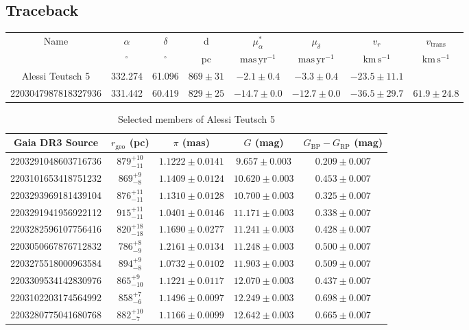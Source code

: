     \subsection{Traceback}
    

\begin{table}
\begin{tabular}{cccccccc}
Name & $\alpha$ & $\delta$ & d & $\mu_{\alpha}^*$ & $\mu_{\delta}$ & $v_r$ & $v_\text{trans}$ \\
 & $\mathrm{{}^{\circ}}$ & $\mathrm{{}^{\circ}}$ & $\mathrm{pc}$ & $\mathrm{mas\,yr^{-1}}$ & $\mathrm{mas\,yr^{-1}}$ & $\mathrm{km\,s^{-1}}$ & $\mathrm{km\,s^{-1}}$ \\
Alessi Teutsch 5 & 332.274 & 61.096 & $869\pm31$ & $-2.1\pm0.4$ & $-3.3\pm0.4$ & $-23.5\pm11.1$ &  \\
2203047987818327936 & 331.442 & 60.419 & $829\pm25$ & $-14.7\pm0.0$ & $-12.7\pm0.0$ & $-36.5\pm29.7$ & $61.9\pm24.8$ \\
\end{tabular}
\end{table}


\begin{table*}[h]
\caption{Selected members of Alessi Teutsch 5}
\label{tab:Alessi_Teutsch_5_members}
\begin{tabular}{ccccc}
\hline
Gaia DR3 Source & $r_{\text{geo}}$ (pc) & $\pi$ (mas) & $G$ (mag) & $G_{\text{BP}}-G_{\text{RP}}$ (mag) \\
\hline
2203291048603716736 & $879^{+10}_{-11}$ & $1.1222\pm0.0141$ & $9.657\pm0.003$ & $0.209\pm0.007$ \\
2203101653418751232 & $869^{+9}_{-8}$ & $1.1409\pm0.0124$ & $10.620\pm0.003$ & $0.453\pm0.007$ \\
2203293969181439104 & $876^{+11}_{-11}$ & $1.1310\pm0.0128$ & $10.700\pm0.003$ & $0.325\pm0.007$ \\
2203291941956922112 & $915^{+11}_{-11}$ & $1.0401\pm0.0146$ & $11.171\pm0.003$ & $0.338\pm0.007$ \\
2203282596107756416 & $820^{+18}_{-18}$ & $1.1690\pm0.0277$ & $11.241\pm0.003$ & $0.428\pm0.007$ \\
2203050667876712832 & $786^{+8}_{-9}$ & $1.2161\pm0.0134$ & $11.248\pm0.003$ & $0.500\pm0.007$ \\
2203275518000963584 & $894^{+9}_{-8}$ & $1.0732\pm0.0102$ & $11.903\pm0.003$ & $0.509\pm0.007$ \\
2203309534142830976 & $865^{+9}_{-10}$ & $1.1221\pm0.0117$ & $12.070\pm0.003$ & $0.437\pm0.007$ \\
2203102203174564992 & $858^{+7}_{-6}$ & $1.1496\pm0.0097$ & $12.249\pm0.003$ & $0.698\pm0.007$ \\
2203280775041680768 & $882^{+10}_{-7}$ & $1.1166\pm0.0099$ & $12.642\pm0.003$ & $0.665\pm0.007$ \\
\hline
\end{tabular}
\end{table*}
